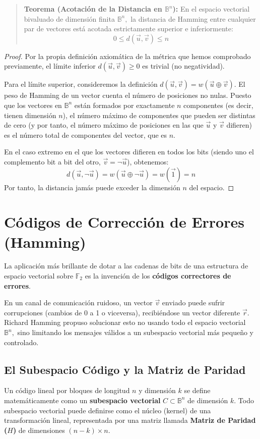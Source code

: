 \begin{quote}\textbf{Teorema (Acotación de la Distancia en $\mathbb{B}^n$):}\label{cota_hamming}
En el espacio vectorial bivaluado de dimensión finita $\mathbb{B}^n,$ la distancia de Hamming entre cualquier par de vectores está acotada estrictamente superior e inferiormente:
\[ 0 \le d(\vec{u}, \vec{v}) \le n \]
\end{quote}
\begin{proof}
Por la propia definición axiomática de la métrica que hemos comprobado previamente, el límite inferior $d(\vec{u}, \vec{v}) \ge 0$ es trivial (no negatividad).

Para el límite superior, consideremos la definición $d(\vec{u}, \vec{v}) = w(\vec{u} \oplus \vec{v}).$ El peso de Hamming de un vector cuenta el número de posiciones no nulas. Puesto que los vectores en $\mathbb{B}^n$ están formados por exactamente $n$ componentes (es decir, tienen dimensión $n$), el número máximo de componentes que pueden ser distintas de cero (y por tanto, el número máximo de posiciones en las que $\vec{u}$ y $\vec{v}$ difieren) es el número total de componentes del vector, que es $n.$ 

En el caso extremo en el que los vectores difieren en todos los bits (siendo uno el complemento bit a bit del otro, $\vec{v} = \neg \vec{u}$), obtenemos:
\[ d(\vec{u}, \neg \vec{u}) = w(\vec{u} \oplus \neg \vec{u}) = w(\vec{1}) = n \]
Por tanto, la distancia jamás puede exceder la dimensión $n$ del espacio.
\end{proof}

\section{Códigos de Corrección de Errores (Hamming)}

La aplicación más brillante de dotar a las cadenas de bits de una estructura de espacio vectorial sobre $\mathbb{F}_2$ es la invención de los \textbf{códigos correctores de errores}. 

En un canal de comunicación ruidoso, un vector $\vec{v}$ enviado puede sufrir corrupciones (cambios de 0 a 1 o viceversa), recibiéndose un vector diferente $\vec{r}.$ Richard Hamming propuso solucionar esto no usando todo el espacio vectorial $\mathbb{B}^n,$ sino limitando los mensajes válidos a un subespacio vectorial más pequeño y controlado.

\subsection{El Subespacio Código y la Matriz de Paridad}
Un código lineal por bloques de longitud $n$ y dimensión $k$ se define matemáticamente como un \textbf{subespacio vectorial} $C \subset \mathbb{B}^n$ de dimensión $k.$ Todo subespacio vectorial puede definirse como el núcleo (kernel) de una transformación lineal, representada por una matriz llamada \textbf{Matriz de Paridad ($H$)} de dimensiones $(n-k) \times n.$

